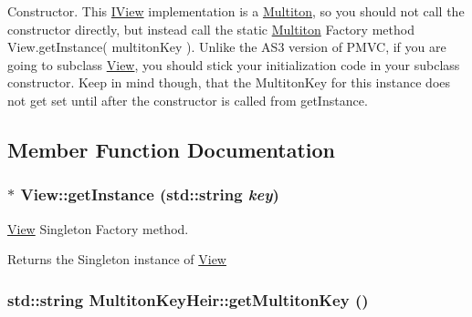 Constructor. This {\ttfamily \hyperlink{class_pure_m_v_c_1_1_i_view}{IView}} implementation is a \hyperlink{class_pure_m_v_c_1_1_multiton}{Multiton}, so you should not call the constructor directly, but instead call the static \hyperlink{class_pure_m_v_c_1_1_multiton}{Multiton} Factory method {\ttfamily View.getInstance( multitonKey )}. Unlike the AS3 version of PMVC, if you are going to subclass \hyperlink{class_pure_m_v_c_1_1_view}{View}, you should stick your initialization code in your subclass constructor. Keep in mind though, that the MultitonKey for this instance does not get set until after the constructor is called from {\ttfamily getInstance}. 

\subsection{Member Function Documentation}
\hypertarget{class_pure_m_v_c_1_1_view_ad1e9acdfeba49c16cc725352b08d4ea3}{
\subsubsection[{getInstance}]{ $\ast$ View::getInstance (std::string {\em key})}}
\label{class_pure_m_v_c_1_1_view_ad1e9acdfeba49c16cc725352b08d4ea3}


\hyperlink{class_pure_m_v_c_1_1_view}{View} Singleton Factory method. \begin{DoxyReturn}{Returns}
the Singleton instance of {\ttfamily \hyperlink{class_pure_m_v_c_1_1_view}{View}} 
\end{DoxyReturn}
\hypertarget{class_pure_m_v_c_1_1_multiton_key_heir_aa5622459d33380deb08dc3cab8b991c7}{
\subsubsection[{getMultitonKey}]{\setlength{\rightskip}{0pt plus 5cm}std::string MultitonKeyHeir::getMultitonKey ()}}
\label{class_pure_m_v_c_1_1_multiton_key_heir_aa5622459d33380deb08dc3cab8b991c7}


